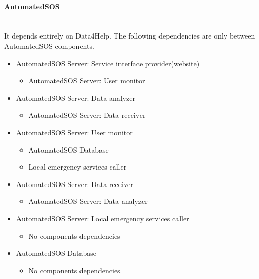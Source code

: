 \documentclass[../DD.tex]{subfiles}
\begin{document}
		\paragraph{AutomatedSOS}\mbox{}\\
		It depends entirely on Data4Help. The following dependencies are only between AutomatedSOS components.
		\begin{itemize}
			\item{AutomatedSOS Server: Service interface provider(website)}
			\begin{itemize}\item{AutomatedSOS Server: User monitor}\end{itemize}

			\item{AutomatedSOS Server: Data analyzer}
			\begin{itemize}\item{AutomatedSOS Server: Data receiver}\end{itemize}

			\item{AutomatedSOS Server: User monitor}
			\begin{itemize}\item{AutomatedSOS Database}\item{Local emergency services caller}\end{itemize}

			\item{AutomatedSOS Server: Data receiver}
			\begin{itemize}\item{AutomatedSOS Server: Data analyzer}\end{itemize}

			\item{AutomatedSOS Server: Local emergency services caller}
			\begin{itemize}\item{No components dependencies}\end{itemize}

			\item{AutomatedSOS Database}
			\begin{itemize}\item{No components dependencies}\end{itemize}
		\end{itemize}
\end{document}
